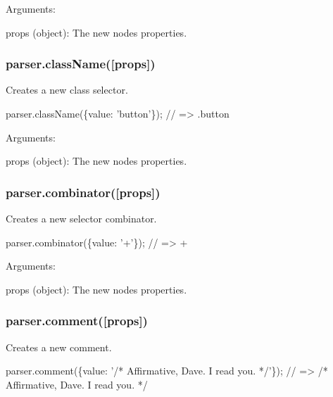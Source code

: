 Arguments\+:


\begin{DoxyItemize}
\item {\ttfamily props (object)}\+: The new node\textquotesingle{}s properties.
\end{DoxyItemize}

\subsubsection*{{\ttfamily parser.\+class\+Name(\mbox{[}props\mbox{]})}}

Creates a new class selector.


\begin{DoxyCode}
parser.className(\{value: 'button'\});
// => .button
\end{DoxyCode}


Arguments\+:


\begin{DoxyItemize}
\item {\ttfamily props (object)}\+: The new node\textquotesingle{}s properties.
\end{DoxyItemize}

\subsubsection*{{\ttfamily parser.\+combinator(\mbox{[}props\mbox{]})}}

Creates a new selector combinator.


\begin{DoxyCode}
parser.combinator(\{value: '+'\});
// => +
\end{DoxyCode}


Arguments\+:


\begin{DoxyItemize}
\item {\ttfamily props (object)}\+: The new node\textquotesingle{}s properties.
\end{DoxyItemize}

\subsubsection*{{\ttfamily parser.\+comment(\mbox{[}props\mbox{]})}}

Creates a new comment.


\begin{DoxyCode}
parser.comment(\{value: '/* Affirmative, Dave. I read you. */'\});
// => /* Affirmative, Dave. I read you. */
\end{DoxyCode}



